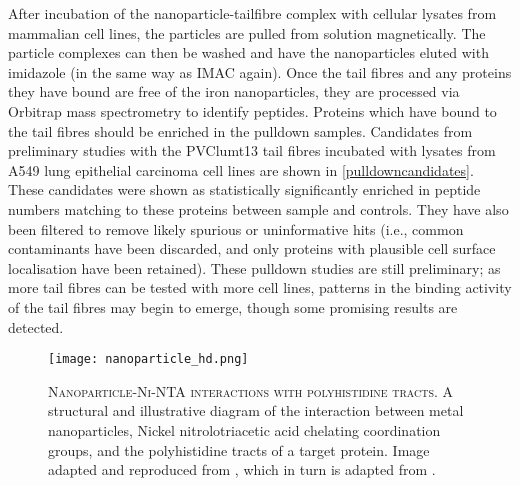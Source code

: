 After incubation of the nanoparticle-tailfibre complex with cellular lysates from mammalian cell lines, the particles are pulled from solution magnetically. The particle complexes can then be washed and have the nanoparticles eluted with imidazole (in the same way as IMAC again). Once the tail fibres and any proteins they have bound are free of the iron nanoparticles, they are processed via Orbitrap mass spectrometry to identify peptides. Proteins which have bound to the tail fibres should be enriched in the pulldown samples. Candidates from preliminary studies with the PVClumt13 tail fibres incubated with lysates from A549 lung epithelial carcinoma cell lines are shown in \vref{pulldowncandidates}. These candidates were shown as statistically significantly enriched in peptide numbers matching to these proteins between sample and controls. They have also been filtered to remove likely spurious or uninformative hits (i.e., common contaminants have been discarded, and only proteins with plausible cell surface localisation have been retained). These pulldown studies are still preliminary; as more tail fibres can be tested with more cell lines, patterns in the binding activity of the tail fibres may begin to emerge, though some promising results are detected.


\begin{figure}[h]
\centering
    \texttt{[image: nanoparticle\_hd.png]}
	\captionsetup{singlelinecheck=off, justification=justified, font=footnotesize, aboveskip=10pt}
	\caption[Dynabead particle interactions]{\textsc{\normalsize Nanoparticle-Ni-NTA interactions with polyhistidine tracts.}\vspace{0.1cm} \newline A structural and illustrative diagram of the interaction between metal nanoparticles, Nickel nitrolotriacetic acid chelating coordination groups, and the polyhistidine tracts of a target protein. Image adapted and reproduced from \cite{Sperling2010}, which in turn is adapted from \cite{Hainfeld1999}.}
\label{nanoparticle}
\end{figure}


